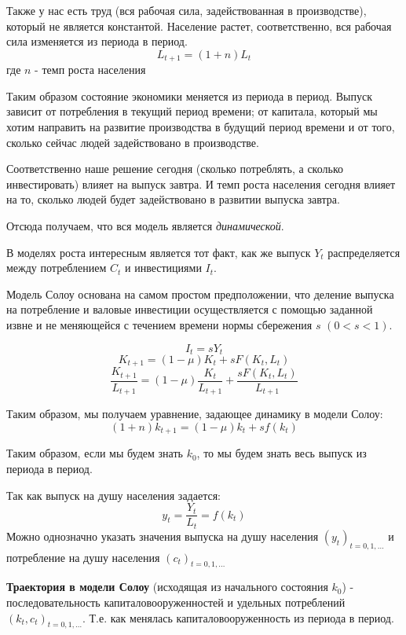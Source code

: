 \documentclass[reqno]{article}
\theoremstyle{definition}
\theoremstyle{definition}
\theoremstyle{definition}
\theoremstyle{definition}
\theoremstyle{definition}
\theoremstyle{definition}
\theoremstyle{definition}
\theoremstyle{definition}
\theoremstyle{definition}
\begin{document}
		Также у нас есть труд (вся рабочая сила, задействованная в производстве), который не является константой. Население растет, соответственно, вся рабочая сила изменяется из периода в период. 
		\begin{equation}\label{eq:1.3.3}
			L_{t+1} = (1 + n) L_t
		\end{equation}
		где $n$ - темп роста населения
		
		Таким образом состояние экономики меняется из периода в период. Выпуск зависит от потребления в текущий период времени; от капитала, который мы хотим направить на развитие производства в будущий период времени и от того, сколько сейчас людей задействовано в производстве. 
		
		Соответственно наше решение сегодня (сколько потреблять, а сколько инвестировать) влияет на выпуск завтра. И темп роста населения сегодня влияет на то, сколько людей будет задействовано в развитии выпуска завтра. 
		
		Отсюда получаем, что вся модель является \emph{динамической}.\bigskip
		
		В моделях роста интересным является тот факт, как же выпуск $Y_t$ распределяется между потреблением $C_t$ и инвестициями $I_t$.
		
		Модель Солоу основана на самом простом предположении, что деление выпуска на потребление и валовые инвестиции осуществляется с помощью заданной извне и не меняющейся с течением времени нормы сбережения $s$ $(0 < s < 1)$. 
		
		$$I_t = s Y_t$$
		$$K_{t+1} = (1 - \mu) K_t + s F(K_t, L_t)$$
		$$\frac{K_{t+1}}{L_{t+1}} = (1 - \mu) \frac{K_t}{L_{t+1}} + \frac{s F(K_t, L_t)}{L_{t+1}}$$
		
		Таким образом, мы получаем уравнение, задающее динамику в модели Солоу:
		\begin{equation}\label{eq:1.3.4}
			(1 + n) k_{t + 1} = (1 - \mu) k_t + s f(k_t)
		\end{equation}
		
		Таким образом, если мы будем знать $k_0$, то мы будем знать весь выпуск из периода в период.
		
		Так как выпуск на душу населения задается:
		$$y_t = \frac{Y_t}{L_t} = f(k_t)$$
		Можно однозначно указать значения выпуска на душу населения $(y_t)_{t=0,1,\dots }$ и потребление на душу населения $(c_t)_{t=0,1,\dots}$ \bigskip
		
		\textbf{Траектория в модели Солоу} (исходящая из начального состояния $k_0$) - последовательность капиталовооруженностей и удельных потреблений $(k_t, c_t)_{t=0,1,\dots}$. Т.е. как менялась капиталовооруженность из периода в период.
		
\end{document}
